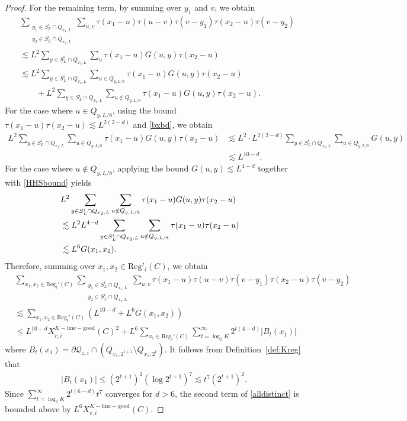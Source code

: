 \documentclass[11pt]{article}
\theoremstyle{definition}
\theoremstyle{remark}
\numberwithin{equation}{section}
\theoremstyle{plain}
\theoremstyle{definition}
\theoremstyle{remark}
\theoremstyle{plain}
\begin{document}
\begin{proof}
For the remaining term, by summing over $y_1$ and $v$, we obtain
\begin{align*}
 &\sum_{\substack{y_1\in S_L^i\cap Q_{x_1,L}\\ y_2\in S_L^i\cap Q_{x_2,L}}}\sum_{u,v}\tau(x_1-u)\tau(u-v)\tau(v-y_1)\tau(x_2-u)\tau(v-y_2)\\
 &\lesssim L^2 \sum_{y\in S_L^i\cap Q_{x_2,L}}\sum_{u}\tau(x_1-u)G(u,y)\tau(x_2-u)\\
 &\lesssim   L^2 \sum_{y\in S_L^i\cap Q_{x_2,L}}\sum_{u \in Q_{y,L/8}}\tau(x_1-u)G(u,y)\tau(x_2-u)\\
 &\qquad+ L^2 \sum_{y\in S_L^i\cap Q_{x_2,L}}\sum_{u \notin Q_{y,L/8}}\tau(x_1-u)G(u,y)\tau(x_2-u).
\end{align*}
For the case where $u \in Q_{y,L/8}$, using the bound $\tau(x_1-u)\tau(x_2-u)\lesssim L^{2(2-d)}$ and \eqref{bxbd}, we obtain
\begin{align*}
   L^2 \sum_{y\in S_L^i\cap Q_{x_2,L}}\sum_{u \in Q_{y,L/8}}\tau(x_1-u)G(u,y)\tau(x_2-u)
   &\lesssim L^2\cdot L^{2(2-d)}\sum_{y\in S_L^i\cap Q_{x_2,L}}\sum_{u \in Q_{y,L/8}}G(u,y)\\
   &\lesssim L^{10-d}.
\end{align*}
For the case where $u \notin Q_{y,L/8}$, applying the bound $G(u,y)\lesssim L^{4-d}$ together with \eqref{HHSbound} yields
\begin{align*}
   \lefteqn{L^2 \sum_{y\in S_L^i\cap Q_{x_2,L}}\sum_{u \notin Q_{y,L/8}}\tau(x_1-u)G(u,y)\tau(x_2-u)}\\
   &\lesssim L^2L^{4-d}\sum_{y\in S_L^i\cap Q_{x_2,L}}\sum_{u \notin Q_{y,L/8}}\tau(x_1-u)\tau(x_2-u)\\
   &\lesssim L^6G(x_1,x_2).
\end{align*}
Therefore, summing over $x_1,x_2 \in \mathrm{Reg}'_i(C)$, we obtain
\begin{align}\label{alldistinct}
  &\sum_{x_1,x_2 \in \mathrm{Reg}_i'(C)}\sum_{\substack{y_1\in S_L^i\cap Q_{x_1,L}\\ y_2\in S_L^i\cap Q_{x_2,L}}}\sum_{u,v}\tau(x_1-u)\tau(u-v)\tau(v-y_1)\tau(x_2-u)\tau(v-y_2)\nonumber\\
   &\lesssim \sum_{x_1,x_2 \in \mathrm{Reg}_i'(C)} (L^{10-d}+L^6G(x_1,x_2))\nonumber\\
    &\le L^{10-d}X_{r,i}^{K-\mathrm{line-good}}(C)^2+ L^6\sum_{x_1 \in \mathrm{Reg}_i'(C)}\sum_{t=\log_2K}^{\infty}2^{t(4-d)}|B_t(x_1)|
\end{align}
where $B_t(x_1)=\partial \mathcal Q_{z,i}\cap (Q_{x_1,2^{t+1}}\setminus Q_{x_1,2^{t}})$. It follows from Definition~\ref{def:Kreg} that
\begin{align*}
    |B_t(x_1)|\le (2^{t+1})^2(\log 2^{t+1})^7\lesssim t^7(2^{t+1})^2.
\end{align*}
Since $\sum_{t=\log_2K}^{\infty}2^{t(6-d)}t^7$ converges for $d>6$, the second term of \eqref{alldistinct} is bounded above by $L^6X_{r,i}^{K-\mathrm{line-good}}(C)$.


\end{proof}
\end{document}
